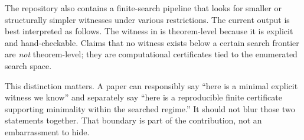 The repository also contains a finite-search pipeline that looks for smaller or
structurally simpler witnesses under various restrictions. The current output is
best interpreted as follows. The witness in  is
theorem-level because it is explicit and hand-checkable. Claims that no witness
exists below a certain search frontier are \emph{not} theorem-level; they are
computational certificates tied to the enumerated search space.



This distinction matters. A paper can responsibly say ``here is a minimal
explicit witness we know'' and separately say ``here is a reproducible finite
certificate supporting minimality within the searched regime.'' It should not
blur those two statements together. That boundary is part of the contribution,
not an embarrassment to hide.
